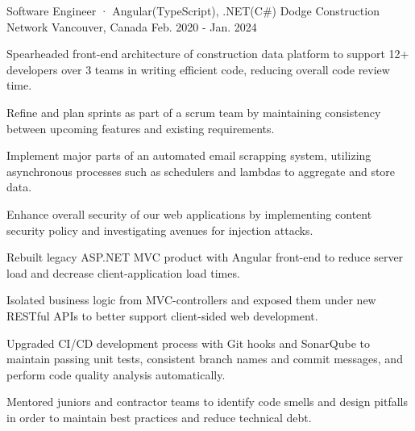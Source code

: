

\begin{cventries}

\cventry
  {Software Engineer · Angular(TypeScript), .NET(C\#)} %
  {Dodge Construction Network} %
  {Vancouver, Canada} %
  {Feb. 2020 - Jan. 2024} %
  {
    \begin{cvitems} %
      \item {Spearheaded front-end architecture of construction data platform to support 12+ developers over 3 teams in writing efficient code, reducing overall code review time.}
      \item {Refine and plan sprints as part of a scrum team by maintaining consistency between upcoming features and existing requirements.}
      \item {Implement major parts of an automated email scrapping system, utilizing asynchronous processes such as schedulers and lambdas to aggregate and store data.}
      \item {Enhance overall security of our web applications by implementing content security policy and investigating avenues for injection attacks.}
      \item {Rebuilt legacy ASP.NET MVC product with Angular front-end to reduce server load and decrease client-application load times.}
      \item {Isolated business logic from MVC-controllers and exposed them under new RESTful APIs to better support client-sided web development.}
      \item {Upgraded CI/CD development process with Git hooks and SonarQube to maintain passing unit tests, consistent branch names and commit messages, and perform code quality analysis automatically.}
      \item {Mentored juniors and contractor teams to identify code smells and design pitfalls in order to maintain best practices and reduce technical debt.}
    \end{cvitems}
  }


\end{cventries}
